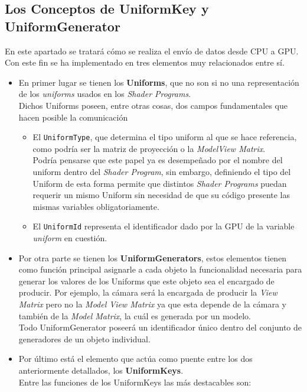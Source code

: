 \subsection{Los Conceptos de UniformKey y UniformGenerator}\label{susec:UnifKeyUnifGen}
En este apartado se tratará cómo se realiza el envío de datos desde CPU a GPU.\\
Con este fin se ha implementado en \robotto tres elementos muy relacionados entre sí.\\
\begin{itemize}
\item En primer lugar se tienen los \textbf{Uniforms}, que no son si no una representación de los \textit{uniforms} usados en los \textit{Shader Programs}.\\
Dichos Uniforms poseen, entre otras cosas, dos campos fundamentales que hacen posible la comunicación
\begin{itemize}
\item El \texttt{UniformType}, que determina el tipo uniform al que se hace referencia, como podría ser la matriz de proyección o la \textit{ModelView Matrix}.\\
Podría pensarse que este papel ya es desempeñado por el nombre del uniform dentro del \textit{Shader Program}, sin embargo, definiendo el tipo del Uniform de esta forma permite que distintos \textit{Shader Programs} puedan requerir un mismo Uniform sin necesidad de que su código presente las mismas variables obligatoriamente.
\item El \texttt{UniformId} representa el identificador dado por la GPU de la variable \textit{uniform} en cuestión.
\end{itemize}
\item Por otra parte se tienen los \textbf{UniformGenerators}, estos elementos tienen como función principal asignarle a cada objeto la funcionalidad necesaria para generar los valores de los Uniforms que este objeto sea el encargado de producir. Por ejemplo, la cámara será la encargada de producir la \textit{View Matrix} pero no la \textit{Model View Matrix} ya que esta depende de la cámara y también de la \textit{Model Matrix}, la cuál es generada por un modelo.\\
Todo UniformGenerator poseerá un identificador único dentro del conjunto de generadores de un objeto individual.
\item Por último está el elemento que actúa como puente entre los dos anteriormente detallados, los \textbf{UniformKeys}.\\
Entre las funciones de los UniformKeys las más destacables son:

\end{itemize}
